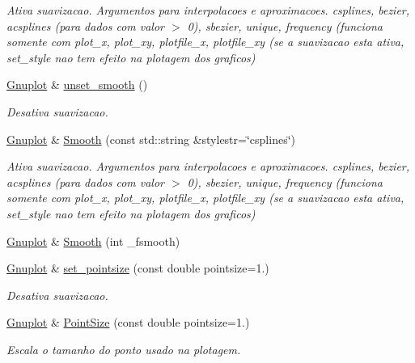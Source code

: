 \begin{DoxyCompactItemize}
\begin{DoxyCompactList}\small\item\em Ativa suavizacao. Argumentos para interpolacoes e aproximacoes. csplines, bezier, acsplines (para dados com valor $>$ 0), sbezier, unique, frequency (funciona somente com plot\+\_\+x, plot\+\_\+xy, plotfile\+\_\+x, plotfile\+\_\+xy (se a suavizacao esta ativa, set\+\_\+style nao tem efeito na plotagem dos graficos) \end{DoxyCompactList}\item 
\hyperlink{class_gnuplot}{Gnuplot} \& \hyperlink{class_gnuplot_aec18795f217d6d8791275a1c866b550e}{unset\+\_\+smooth} ()
\begin{DoxyCompactList}\small\item\em Desativa suavizacao. \end{DoxyCompactList}\item 
\hyperlink{class_gnuplot}{Gnuplot} \& \hyperlink{class_gnuplot_aedd7a473c34c83b3b9ec1cea9891d0f2}{Smooth} (const std\+::string \&stylestr=\char`\"{}csplines\char`\"{})
\begin{DoxyCompactList}\small\item\em Ativa suavizacao. Argumentos para interpolacoes e aproximacoes. csplines, bezier, acsplines (para dados com valor $>$ 0), sbezier, unique, frequency (funciona somente com plot\+\_\+x, plot\+\_\+xy, plotfile\+\_\+x, plotfile\+\_\+xy (se a suavizacao esta ativa, set\+\_\+style nao tem efeito na plotagem dos graficos) \end{DoxyCompactList}\item 
\hyperlink{class_gnuplot}{Gnuplot} \& \hyperlink{class_gnuplot_a9eaf8050edfad9d926d41b102d2f24cb}{Smooth} (int \+\_\+fsmooth)
\item 
\hyperlink{class_gnuplot}{Gnuplot} \& \hyperlink{class_gnuplot_a95ec1636a871447dfe99463b769339c7}{set\+\_\+pointsize} (const double pointsize=1.)
\begin{DoxyCompactList}\small\item\em Desativa suavizacao. \end{DoxyCompactList}\item 
\hyperlink{class_gnuplot}{Gnuplot} \& \hyperlink{class_gnuplot_adb4a794cf81d9b615f133feca1e917e8}{Point\+Size} (const double pointsize=1.)
\begin{DoxyCompactList}\small\item\em Escala o tamanho do ponto usado na plotagem. \end{DoxyCompactList}\item 

\end{DoxyCompactItemize}
